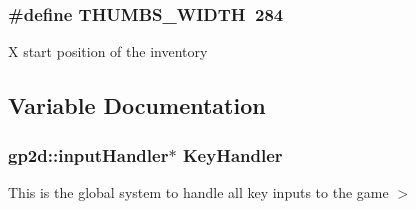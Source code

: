 \subsubsection{\setlength{\rightskip}{0pt plus 5cm}\#define THUMBS\_\-WIDTH~284}\label{globals_8h_bdc4212fc051e4e450e545c220f2fa40}


X start position of the inventory 

\subsection{Variable Documentation}
\subsubsection{\setlength{\rightskip}{0pt plus 5cm}gp2d::inputHandler$\ast$ {\bf KeyHandler}}\label{globals_8h_e1386f580f80c77ed1a02d791b6b77f4}


This is the global system to handle all key inputs to the game $>$ 